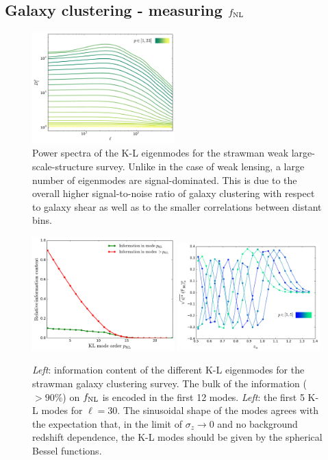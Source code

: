 \documentclass[twocolumn,amsfont,amssymb,amsmath, showpacs,balancelastpage, nofootinbib]{revtex4-1}
\begin{document}
  \subsection{Galaxy clustering - measuring $f_{\rm NL}$}\label{ssec:results.fnl}
    \begin{figure}
      \centering
      \includegraphics[width=0.49\textwidth]{Figs/d_p_gc}
      \caption{Power spectra of the K-L eigenmodes for the strawman weak large-scale-structure survey. Unlike in the case of weak lensing, a large number of eigenmodes are signal-dominated. This is due to the overall higher signal-to-noise ratio of galaxy clustering with respect to galaxy shear as well as to the smaller correlations between distant bins.}\label{fig:dp_gc}
    \end{figure}
    \begin{figure}
      \centering
      \includegraphics[width=0.49\textwidth]{Figs/information_gc}
      \includegraphics[width=0.49\textwidth]{Figs/kl_modes_gc}
      \caption{{\sl Left}: information content of the different K-L eigenmodes for the strawman galaxy clustering survey. The bulk of the information ($>90\%$) on $f_{\rm NL}$ is encoded in the first 12 modes. {\sl Left}: the first 5 K-L modes for $\ell=30$. The sinusoidal shape of the modes agrees with the expectation that, in the limit of $\sigma_z\rightarrow0$ and no background redshift dependence, the K-L modes should be given by the spherical Bessel functions. }\label{fig:kl_gc}
    \end{figure}
\end{document}
